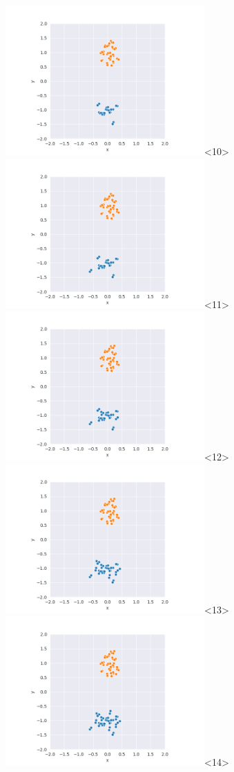 \begin{frame}
  \includegraphics[width=3in]{../png/single/single_46.png}<10>
  \includegraphics[width=3in]{../png/single/single_51.png}<11>
  \includegraphics[width=3in]{../png/single/single_56.png}<12>
  \includegraphics[width=3in]{../png/single/single_61.png}<13>
  \includegraphics[width=3in]{../png/single/single_66.png}<14>

\end{frame}
